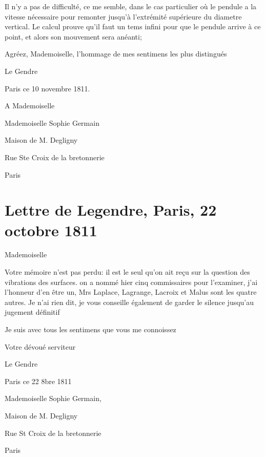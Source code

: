 \documentclass[11pt,a4paper]{article}
\begin{document}
Il n'y a pas de difficulté, ce me semble, dans le cas particulier où le
pendule a la vitesse nécessaire pour remonter jusqu'à l'extrémité supérieure
du diametre vertical. Le calcul prouve qu'il faut un tems infini pour que le
pendule arrive à ce point, et alors son mouvement sera anéanti;

Agréez, Mademoiselle, l'hommage de mes sentimens les plus distingués

Le Gendre

Paris ce 10 novembre 1811.


A Mademoiselle

Mademoiselle Sophie Germain

Maison de M. Degligny

Rue Ste Croix de la bretonnerie

Paris


\section{Lettre de Legendre, Paris, 22 octobre 1811}

Mademoiselle

Votre mémoire n'est pas perdu: il est le seul qu'on ait reçu sur la question
des vibrations des surfaces. on a nommé hier cinq commissaires pour
l'examiner, j'ai l'honneur d'en être un, Mrs Laplace, Lagrange, Lacroix et
Malus sont les quatre autres. Je n'ai rien dit, je vous conseille également
de garder le silence jusqu'au jugement définitif

Je suis avec tous les sentimens que vous me connoissez

Votre dévoué serviteur

Le Gendre

Paris ce 22 8bre 1811


Mademoiselle Sophie Germain,

Maison de M. Degligny

Rue St Croix de la bretonnerie

Paris
\end{document}
